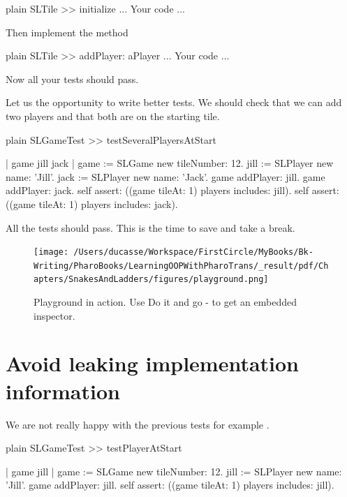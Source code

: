 \documentclass[10pt,twoside,english]{_support/latex/sbabook/sbabook}
\begin{document}
\begin{displaycode}{plain}
SLTile >> initialize
	...  Your code ...
\end{displaycode}

Then implement the method 

\begin{displaycode}{plain}
SLTile >> addPlayer: aPlayer
	... Your code ...
\end{displaycode}

Now all your tests should pass.

Let us the opportunity to write better tests. We should check that we can add two players and that both are on the starting tile. 

\begin{displaycode}{plain}
SLGameTest >> testSeveralPlayersAtStart

	| game jill jack |
	game := SLGame new tileNumber: 12.
	jill := SLPlayer new name: 'Jill'.
	jack := SLPlayer new name: 'Jack'.
	game addPlayer: jill.
	game addPlayer: jack.
	self assert: ((game tileAt: 1) players includes: jill).
	self assert: ((game tileAt: 1) players includes: jack).
\end{displaycode}

All the tests should pass. This is the time to save and take a break.


\begin{figure}

\begin{center}
\texttt{[image: /Users/ducasse/Workspace/FirstCircle/MyBooks/Bk-Writing/PharoBooks/LearningOOPWithPharoTrans/\_result/pdf/Chapters/SnakesAndLadders/figures/playground.png]}\caption{Playground in action. Use Do it and go - to get an embedded inspector.\label{fig:snakesplay}}\end{center}
\end{figure}

\section{Avoid leaking implementation information}
We are not really happy with the previous tests for example .

\begin{displaycode}{plain}
SLGameTest >> testPlayerAtStart

	| game jill |
	game := SLGame new tileNumber: 12.
	jill := SLPlayer new name: 'Jill'.
	game addPlayer: jill. 
	self assert: ((game tileAt: 1) players includes: jill).
\end{displaycode}
\end{document}
